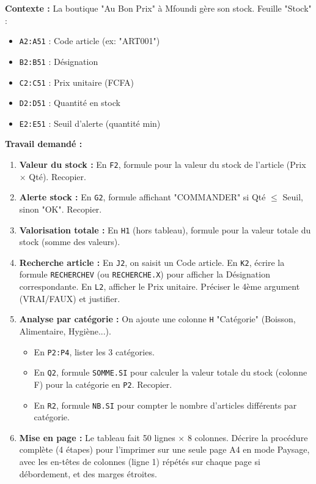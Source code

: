\documentclass[11pt]{article}
\begin{document}
\begin{exercice}
\textbf{Contexte :} La boutique "Au Bon Prix" à Mfoundi gère son stock. Feuille "Stock" :
\begin{itemize}
    \item \texttt{A2:A51} : Code article (ex: "ART001")
    \item \texttt{B2:B51} : Désignation
    \item \texttt{C2:C51} : Prix unitaire (FCFA)
    \item \texttt{D2:D51} : Quantité en stock
    \item \texttt{E2:E51} : Seuil d'alerte (quantité min)
\end{itemize}

\textbf{Travail demandé :}
\begin{enumerate}
    \item \textbf{Valeur du stock :} En \texttt{F2}, formule pour la valeur du stock de l'article (Prix $\times$ Qté). Recopier.
    \item \textbf{Alerte stock :} En \texttt{G2}, formule affichant "COMMANDER" si Qté $\le$ Seuil, sinon "OK". Recopier.
    \item \textbf{Valorisation totale :} En \texttt{H1} (hors tableau), formule pour la valeur totale du stock (somme des valeurs).
    \item \textbf{Recherche article :} En \texttt{J2}, on saisit un Code article. En \texttt{K2}, écrire la formule \texttt{RECHERCHEV} (ou \texttt{RECHERCHE.X}) pour afficher la Désignation correspondante. En \texttt{L2}, afficher le Prix unitaire. Préciser le 4ème argument (VRAI/FAUX) et justifier.
    \item \textbf{Analyse par catégorie :} On ajoute une colonne \texttt{H} "Catégorie" (Boisson, Alimentaire, Hygiène...).
    \begin{itemize}
        \item En \texttt{P2:P4}, lister les 3 catégories.
        \item En \texttt{Q2}, formule \texttt{SOMME.SI} pour calculer la valeur totale du stock (colonne F) pour la catégorie en \texttt{P2}. Recopier.
        \item En \texttt{R2}, formule \texttt{NB.SI} pour compter le nombre d'articles différents par catégorie.
    \end{itemize}
    \item \textbf{Mise en page :} Le tableau fait 50 lignes $\times$ 8 colonnes. Décrire la procédure complète (4 étapes) pour l'imprimer sur une seule page A4 en mode Paysage, avec les en-têtes de colonnes (ligne 1) répétés sur chaque page si débordement, et des marges étroites.
\end{enumerate}
\end{exercice}
\end{document}
